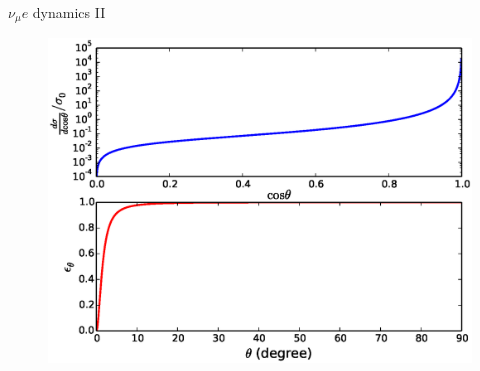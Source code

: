 \documentclass{beamer}
\begin{document}
\begin{frame}{$\nu_\mu e$ dynamics II}
\begin{figure}
\centering
  \includegraphics[width=\textwidth]{figures/xsec_cut_eff.eps}
\end{figure}
\end{frame}
\end{document}
